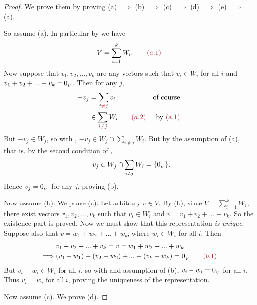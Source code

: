 \begin{proof}
We prove them by proving (a) \(\implies\) (b) \(\implies\) (c) \(\implies\) (d) \(\implies\) (e) \(\implies\) (a).

So assume (a).
In particular by  we have
\[
    V = \sum_{i = 1}^k W_i. \quad \quad \MAROON{(a.1)}
\]
Now suppose that \(v_1, v_2, ..., v_k\) are any vectors such that \(v_i \in W_i\) for all \(i\) and \(v_1 + v_2 + ... + v_k = 0_{_V}\).
Then for any \(j\),
\begin{align*}
    -v_j & = \sum_{i \RED{\ne} j} v_i & \text{of course} \\
         & \in \sum_{i \RED{\ne} j} W_i \quad \quad \MAROON{(a.2)} & \text{by \MAROON{(a.1)}}
\end{align*}
But \(-v_j \in W_j\), so with , \(-v_j \in W_j \cap \sum_{i \ne j} W_i\).
But by the assumption of (a), that is, by the second condition of ,
\[
    -v_j \in W_j \cap \sum_{i \ne j} W_i = \{ 0_{_V} \}.
\]
Hence \(v_j = 0_{_V}\) for any \(j\), proving (b).

Now assume (b). We prove (c).
Let arbitrary \(v \in V\).
By (b), since \(V = \sum_{i = 1}^k W_i\), there exist vectors \(v_1, v_2, ..., v_k\) such that \(v_i \in W_i\) and \(v = v_1 + v_2 + ... + v_k\).
So the existence part is proved.
Now we must show that this representation \emph{is unique}. Suppose also that \(v = w_1 + w_2 + ... + w_k\), where \(w_i \in W_i\) for all \(i\).
Then
\begin{align*}
             & v_1 + v_2 + ... + v_k = v = w_1 + w_2 + ... + w_k \\
    \implies & (v_1 - w_1) + (v_2 - w_2) + ... + (v_k - w_k) = \OV \quad \quad \MAROON{(b.1)}
\end{align*}
But \(v_i - w_i \in W_i\) for all \(i\), so with  and assumption of (b), \(v_i - w_i = 0_{_V}\) for all \(i\).
Thus \(v_i = w_i\) for all \(i\), proving the uniqueness of the representation.

Now assume (c). We prove (d).


\end{proof}
